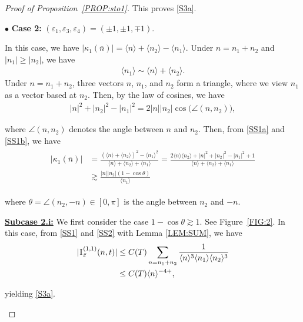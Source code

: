 \documentclass[%
11pt,  reqno]{amsart}
\newcommand{\1}{\hspace{0.2mm}\text{I}\hspace{0.2mm}}
\newcommand{\noi}{\noindent}
\newcommand{\eps}{\varepsilon}
\newcommand{\kk}{\kappa}
\newcommand{\ta}{\theta}
\newcommand{\ges}{\gtrsim}
\newcommand{\jb}[1]
{\langle #1 \rangle}
\numberwithin{equation}{section}
\numberwithin{theorem}{section}
\begin{document}
\begin{proof}[Proof of Proposition~\ref{PROP:sto1}]
\noi
This proves \eqref{S3a}.

\medskip

\noi
$\bullet$ {\bf Case 2:}
$(\eps_1, \eps_3, \eps_4) = (\pm 1, \pm1, \mp1)$.

In this case, we have
$|\kk_1(\bar n)|=  \jb{n} + \jb{n_2} -\jb{n_1}$.
Under $n = n_1 + n_2$
and  $|n_1| \geq |n_2|$, we have 
\begin{align}
\jb{n_1} \sim \jb{n}+ \jb{n_2}.
\label{SS1a}
\end{align}
Under $ n = n_1 + n_2$, 
three vectors $n$, $n_1$, and $n_2$ form a triangle,
where we view $n_1$ as a vector based at $n_2$.
Then, 
by the law of cosines, we have
\begin{align}
|n|^2 + |n_2|^2 - |n_1|^2 = 2 |n| |n_2| \cos \big( \angle(n, n_2)\big),  
\label{SS1b}
\end{align}

\noi
where
$\angle(n, n_2)$ denotes the angle between $n$ and $n_2$.
Then, from \eqref{SS1a} and \eqref{SS1b}, 
we have
\begin{align}
\begin{split}
|\kk_1(\bar n)| 
& =  \frac{(\jb{n} + \jb{n_2})^2 -\jb{n_1}^2}
{\jb{n} + \jb{n_2} +\jb{n_1}}
  =  \frac{2\jb{n}\jb{n_2} + |n|^2 + |n_2|^2 - |n_1|^2 + 1}
{\jb{n} + \jb{n_2} +\jb{n_1}}\\
& 
\ges
 \frac{|n| |n_2| (1 - \cos \theta)}
{\jb{n_1}} 
\end{split}
\label{SS2}
\end{align}

\noi
where $\ta = \angle(n_2, -n) \in [0, \pi]$ is the angle between $n_2$ and $-n$.



\smallskip
\noi
{\bf \underline{Subcase 2.i:}}
We first consider the case $1 - \cos \ta \ges 1$.
See Figure~\ref{FIG:2}.
In this case, from \eqref{SS1} and \eqref{SS2}
with Lemma \ref{LEM:SUM}, 
we have 
\begin{align}
\begin{split}
|\1^{(1,1)}_{\bar \eps} (n, t)|
& \le C(T)   
\sum_{n = n_1 + n_2} 
\frac{1}{\jb{n}^{3}\jb{n_1} \jb{n_2}^{3}}\\
& \le C(T)   
\jb{n}^{-4+}, 
\end{split}
\label{SS3}
\end{align}

\noi
yielding \eqref{S3a}.

\begin{figure}[h]
\begin{tikzpicture}


\end{tikzpicture}
\end{figure}
\end{proof}
\end{document}
